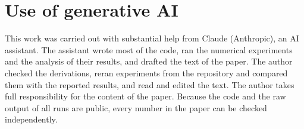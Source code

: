\documentclass[11pt]{article}
\begin{document}
\section*{Use of generative AI}
This work was carried out with substantial help from Claude (Anthropic), an AI assistant. The assistant
wrote most of the code, ran the numerical experiments and the analysis of their results, and drafted the
text of the paper. The author checked the derivations, reran experiments from the repository and compared
them with the reported results, and read and edited the text. The author takes full responsibility for
the content of the paper. Because the code and the raw output of all runs are public, every number in the
paper can be checked independently.




\appendix


\end{document}
